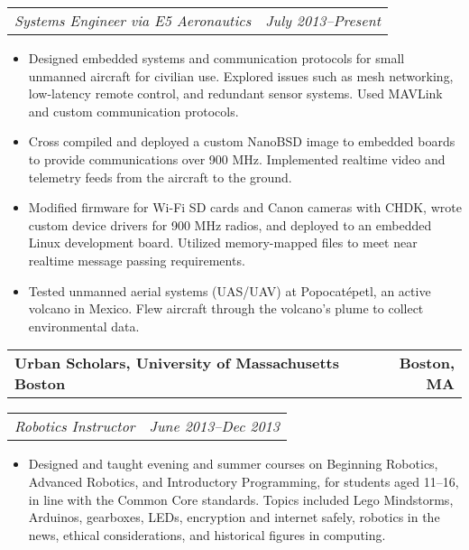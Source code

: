 \documentclass[10pt,letterpaper]{article}
\newcommand{\headerrow}[2]{%
    \begin{tabularx}{\linewidth}{Xr}
	    #1 & #2 \\
    \end{tabularx}
}
\begin{document}
    \headerrow{\textit{Systems Engineer via E5 Aeronautics}}
        {\textit{July 2013--Present}}
    \begin{itemize}[label=--]
        \item Designed embedded systems and communication protocols for small
            unmanned aircraft for civilian use.  Explored
            issues such as mesh networking, low-latency remote control, and
            redundant sensor systems.  Used MAVLink and custom communication
            protocols.

        \item Cross compiled and deployed a custom NanoBSD image to embedded
            boards to provide communications over 900 MHz.  Implemented
            realtime video and telemetry feeds from the aircraft to the ground.

        \item Modified firmware for Wi-Fi SD cards and Canon cameras with CHDK,
            wrote custom device drivers for 900 MHz radios, and deployed to an
            embedded Linux development board.  Utilized memory-mapped files to
            meet near realtime message passing requirements.

        \item Tested unmanned aerial systems (UAS/UAV) at Popocatépetl, an active
            volcano in Mexico. Flew aircraft through the volcano's plume to
            collect environmental data.
    \end{itemize}

    \headerrow{\textbf{Urban Scholars, University of Massachusetts Boston}}
		{\textbf{Boston, MA}}
	\headerrow{\textit{Robotics Instructor}}{\textit{June 2013--Dec 2013}}
    \begin{itemize}[label=--]
        \item Designed and taught evening and summer courses on Beginning
            Robotics, Advanced Robotics, and Introductory Programming, for
            students aged 11--16, in line with the Common Core standards.
            Topics included Lego Mindstorms, Arduinos, gearboxes, LEDs,
            encryption and internet safely, robotics in the news, ethical
            considerations, and historical figures in computing.
	\end{itemize}
\end{document}
